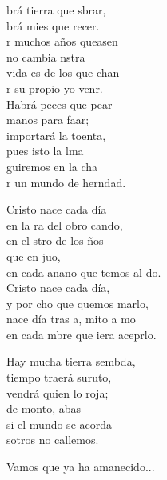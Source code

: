 \begin{cancion}%
	brá tierra que sbrar,\\
	brá mies que recer.\\
	r muchos años queasen\\
	no cambia nstra \\
	 vida es de los que chan\\
	r su propio yo venr.\\
	\jump
	Habrá peces que pear\\
	manos para faar;\\
	 importará la toenta,\\
	pues isto la lma \\
	guiremos en la cha\\
	r un mundo de herndad.  \jump\\
	\begin{chorus}%
	\jump
	Cristo nace cada día\\
		en la ra del obro cando,\\
		en el stro de los ños\\
		que en juo,\\
		en cada anano que temos al do.\\
	\jump
	Cristo nace cada día,\\
		y por cho que quemos marlo,\\
		nace día tras a, mito a mo\\
		en cada mbre que iera aceprlo.\jump\\
	\end{chorus}%
	Hay mucha tierra sembda,\\
	 tiempo traerá suruto,\\
	 vendrá quien lo roja;\\
	de monto, abas\\
	si el mundo se acorda\\
	sotros no callemos.\jump\\
	\begin{chorus}%
	Vamos que ya ha amanecido...\jump\\
	\end{chorus}%
	\jump
\end{cancion}%
